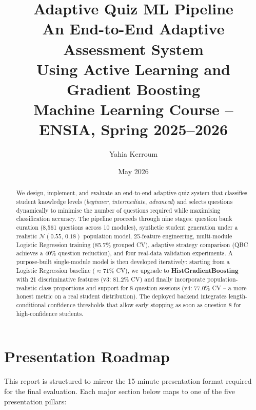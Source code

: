 \documentclass[12pt,a4paper]{article}
\title{
  \vspace{-1cm}
  {\Large\bfseries Adaptive Quiz ML Pipeline} \\[0.5em]
  {\large An End-to-End Adaptive Assessment System\\
  Using Active Learning and Gradient Boosting} \\[1em]
  {\normalsize Machine Learning Course -- ENSIA, Spring 2025--2026}
}
\author{Yahia Kerroum}
\date{May 2026}
\begin{document}
\maketitle
\thispagestyle{fancy}

\begin{abstract}
We design, implement, and evaluate an end-to-end adaptive quiz system that classifies
student knowledge levels (\emph{beginner}, \emph{intermediate}, \emph{advanced}) and
selects questions dynamically to minimise the number of questions required while
maximising classification accuracy.
The pipeline proceeds through nine stages: question bank curation (8,561 questions across
10 modules), synthetic student generation under a realistic $\mathcal{N}(0.55,\,0.18)$
population model, 25-feature engineering, multi-module Logistic Regression training
(85.7\% grouped CV), adaptive strategy comparison (QBC achieves a 40\% question
reduction), and four real-data validation experiments.
A purpose-built single-module model is then developed iteratively: starting from a
Logistic Regression baseline (\(\approx\)71\% CV), we upgrade to
\textbf{HistGradientBoosting} with 21 discriminative features (v3: 81.2\% CV) and
finally incorporate population-realistic class proportions and support for 8-question
sessions (v4: 77.0\% CV -- a more honest metric on a real student distribution).
The deployed backend integrates length-conditional confidence thresholds that allow
early stopping as soon as question 8 for high-confidence students.
\end{abstract}

\tableofcontents
\newpage

\section{Presentation Roadmap}
\label{sec:roadmap}

This report is structured to mirror the 15-minute presentation format required for
the final evaluation. Each major section below maps to one of the five presentation
pillars:
\end{document}
